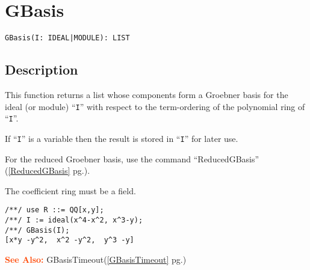 \documentclass[a4paper]{mybook}
\newenvironment{command}{}{} %
\newcommand\SeeAlso{\par\textcolor{OrangeRed}{\textbf{\large See Also: }}}
\begin{document}
\section{GBasis}
\label{GBasis}
\begin{command} %


\begin{Verbatim}[label=syntax, rulecolor=\color{MidnightBlue},
frame=single]
GBasis(I: IDEAL|MODULE): LIST
\end{Verbatim}


\subsection*{Description}

This function returns a list whose components form a Groebner basis for
the ideal (or module) ``\verb&I&'' with respect to the term-ordering of the
polynomial ring of ``\verb&I&''.
\par 
If ``\verb&I&'' is a variable then the result is stored in ``\verb&I&'' for later use.
\par 
For the reduced Groebner basis, use the command ``ReducedGBasis'' (\ref{ReducedGBasis} pg.\pageref{ReducedGBasis}).
\par 
The coefficient ring must be a field.
\begin{Verbatim}[label=example, rulecolor=\color{PineGreen}, frame=single]
/**/ use R ::= QQ[x,y];
/**/ I := ideal(x^4-x^2, x^3-y);
/**/ GBasis(I);
[x*y -y^2,  x^2 -y^2,  y^3 -y]
\end{Verbatim}


\SeeAlso %
  GBasisTimeout(\ref{GBasisTimeout} pg.\pageref{GBasisTimeout})
\end{command} %
\end{document}
